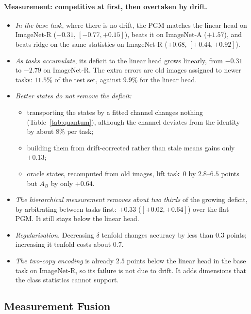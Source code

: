 \paragraph{Measurement: competitive at first, then overtaken by drift.}
\begin{itemize}
  \item \emph{In the base task}, where there is no drift, the PGM matches
    the linear head on ImageNet-R ($-0.31$, $[-0.77,+0.15]$), beats it on
    ImageNet-A ($+1.57$), and beats ridge on the same statistics on
    ImageNet-R ($+0.68$, $[+0.44,+0.92]$).
  \item \emph{As tasks accumulate}, its deficit to the linear head grows
    linearly, from $-0.31$ to $-2.79$ on ImageNet-R. The extra errors are
    old images assigned to newer tasks: $11.5\%$ of the test set, against
    $9.9\%$ for the linear head.
  \item \emph{Better states do not remove the deficit:}
    \begin{itemize}
      \item transporting the states by a fitted channel changes nothing
        (Table~\ref{tab:quantum}), although the channel deviates from the
        identity by about $8\%$ per task;
      \item building them from drift-corrected rather than stale means gains
        only $+0.13$;
      \item oracle states, recomputed from old images, lift task~0 by
        $2.8$--$6.5$ points but $A_B$ by only $+0.64$.
    \end{itemize}
  \item \emph{The hierarchical measurement removes about two thirds} of the
    growing deficit, by arbitrating between tasks first: $+0.33$
    ($[+0.02,+0.64]$) over the flat PGM. It still stays below the linear head.
  \item \emph{Regularisation.} Decreasing $\delta$ tenfold changes accuracy by
    less than $0.3$ points; increasing it tenfold costs about $0.7$.
  \item \emph{The two-copy encoding} is already $2.5$ points below the linear
    head in the base task on ImageNet-R, so its failure is not due to drift.
    It adds dimensions that the class statistics cannot support.
\end{itemize}

\subsection{Measurement Fusion}
\label{sec:fusion-results}

